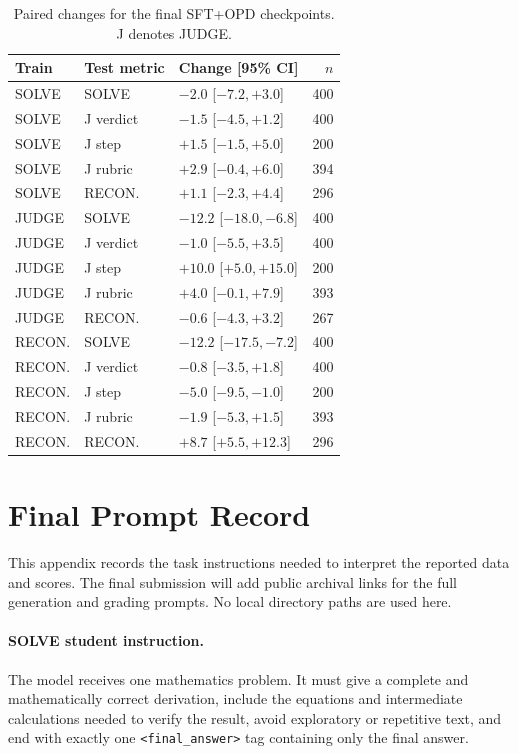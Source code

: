 \documentclass[11pt]{article}
\begin{document}
\begin{table}[h]
\centering
\footnotesize
\setlength{\tabcolsep}{2.4pt}
\begin{tabular}{lllr}
\toprule
Train & Test metric & Change [95\% CI] & $n$ \\
\midrule
SOLVE & SOLVE & $-2.0$ [$-7.2,+3.0$] & 400 \\
SOLVE & J verdict & $-1.5$ [$-4.5,+1.2$] & 400 \\
SOLVE & J step & $+1.5$ [$-1.5,+5.0$] & 200 \\
SOLVE & J rubric & $+2.9$ [$-0.4,+6.0$] & 394 \\
SOLVE & RECON. & $+1.1$ [$-2.3,+4.4$] & 296 \\
\midrule
JUDGE & SOLVE & $-12.2$ [$-18.0,-6.8$] & 400 \\
JUDGE & J verdict & $-1.0$ [$-5.5,+3.5$] & 400 \\
JUDGE & J step & $+10.0$ [$+5.0,+15.0$] & 200 \\
JUDGE & J rubric & $+4.0$ [$-0.1,+7.9$] & 393 \\
JUDGE & RECON. & $-0.6$ [$-4.3,+3.2$] & 267 \\
\midrule
RECON. & SOLVE & $-12.2$ [$-17.5,-7.2$] & 400 \\
RECON. & J verdict & $-0.8$ [$-3.5,+1.8$] & 400 \\
RECON. & J step & $-5.0$ [$-9.5,-1.0$] & 200 \\
RECON. & J rubric & $-1.9$ [$-5.3,+1.5$] & 393 \\
RECON. & RECON. & $+8.7$ [$+5.5,+12.3$] & 296 \\
\bottomrule
\end{tabular}
\caption{Paired changes for the final SFT+OPD checkpoints. J denotes JUDGE.}
\label{tab:transfer-final-full}
\end{table}

\clearpage
\section{Final Prompt Record}
\label{app:prompts}

This appendix records the task instructions needed to interpret the reported data and scores. The final submission will add public archival links for the full generation and grading prompts. No local directory paths are used here.

\paragraph{SOLVE student instruction.}
The model receives one mathematics problem. It must give a complete and mathematically correct derivation, include the equations and intermediate calculations needed to verify the result, avoid exploratory or repetitive text, and end with exactly one \texttt{<final\_answer>} tag containing only the final answer.
\end{document}
